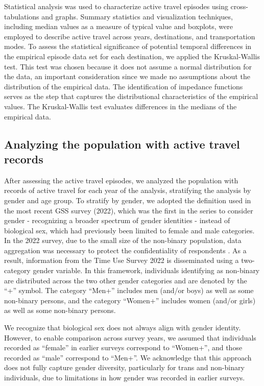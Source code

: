 \documentclass[preprint, 3p,
authoryear]{elsarticle} %
\begin{document}
Statistical analysis was used to characterize active travel episodes
using cross-tabulations and graphs. Summary statistics and visualization
techniques, including median values as a measure of typical value and
boxplots, were employed to describe active travel across years,
destinations, and transportation modes. To assess the statistical
significance of potential temporal differences in the empirical episode
data set for each destination, we applied the Kruskal-Wallis test. This
test was chosen because it does not assume a normal distribution for the
data, an important consideration since we made no assumptions about the
distribution of the empirical data. The identification of impedance
functions serves as the step that captures the distributional
characteristics of the empirical values. The Kruskal-Wallis test
evaluates differences in the medians of the empirical data.

\subsection{Analyzing the population with active travel
records}\label{analyzing-the-population-with-active-travel-records}

After assessing the active travel episodes, we analyzed the population
with records of active travel for each year of the analysis, stratifying
the analysis by gender and age group. To stratify by gender, we adopted
the definition used in the most recent GSS survey (2022), which was the
first in the series to consider gender - recognizing a broader spectrum
of gender identities - instead of biological sex, which had previously
been limited to female and male categories. In the 2022 survey, due to
the small size of the non-binary population, data aggregation was
necessary to protect the confidentiality of respondents
\citep{statisticscanada2025}. As a result, information from the Time Use
Survey 2022 is disseminated using a two-category gender variable. In
this framework, individuals identifying as non-binary are distributed
across the two other gender categories and are denoted by the ``+''
symbol. The category ``Men+'' includes men (and/or boys) as well as some
non-binary persons, and the category ``Women+'' includes women (and/or
girls) as well as some non-binary persons.

We recognize that biological sex does not always align with gender
identity. However, to enable comparison across survey years, we assumed
that individuals recorded as ``female'' in earlier surveys correspond to
``Women+'', and those recorded as ``male'' correspond to ``Men+''. We
acknowledge that this approach does not fully capture gender diversity,
particularly for trans and non-binary individuals, due to limitations in
how gender was recorded in earlier surveys.
\end{document}

